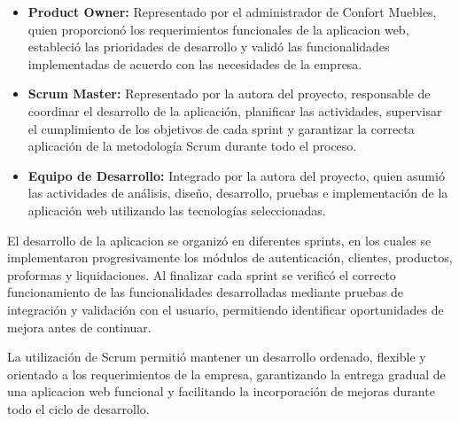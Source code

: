 \begin{itemize}

\item \textbf{Product Owner:} Representado por el administrador de Confort Muebles, quien proporcionó los requerimientos funcionales de la aplicacion web, estableció las prioridades de desarrollo y validó las funcionalidades implementadas de acuerdo con las necesidades de la empresa.

\item \textbf{Scrum Master:} Representado por la autora del proyecto, responsable de coordinar el desarrollo de la aplicación, planificar las actividades, supervisar el cumplimiento de los objetivos de cada sprint y garantizar la correcta aplicación de la metodología Scrum durante todo el proceso.

\item \textbf{Equipo de Desarrollo:} Integrado por la autora del proyecto, quien asumió las actividades de análisis, diseño, desarrollo, pruebas e implementación de la aplicación web utilizando las tecnologías seleccionadas.

\end{itemize}

El desarrollo de la aplicacion se organizó en diferentes sprints, en los cuales se implementaron progresivamente los módulos de autenticación, clientes, productos, proformas y liquidaciones. Al finalizar cada sprint se verificó el correcto funcionamiento de las funcionalidades desarrolladas mediante pruebas de integración y validación con el usuario, permitiendo identificar oportunidades de mejora antes de continuar.

La utilización de Scrum permitió mantener un desarrollo ordenado, flexible y orientado a los requerimientos de la empresa, garantizando la entrega gradual de una aplicacion web funcional y facilitando la incorporación de mejoras durante todo el ciclo de desarrollo.
